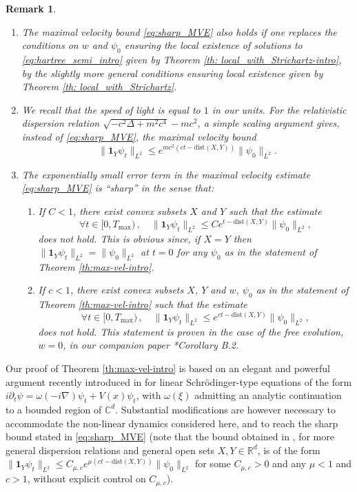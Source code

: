 \documentclass[12pt]{article}
\newcommand{\R}{\mathbb{R}}
\newcommand{\dXY}{{\mathrm{dist}(X,Y)}}
\theoremstyle{plain}
\newtheorem{rem}[theo]{Remark}
\begin{document}
\begin{rem}$ $
\begin{enumerate}
\item    The maximal velocity bound \eqref{eq:sharp_MVE} also holds if one replaces the conditions on $w$ and $\psi_0$ ensuring the local existence of solutions to \eqref{eq:hartree_semi_intro} given by Theorem \ref{th: local_with_Strichartz-intro}, by the slightly more general conditions ensuring local existence given by Theorem \ref{th: local_with_Strichartz}.
\item
We recall that the speed of light is equal to $1$ in our units. For the relativistic dispersion relation $\sqrt{-c^2\Delta+m^2c^4}-mc^2$, a simple scaling argument gives, instead of \eqref{eq:sharp_MVE}, the maximal velocity bound
    \begin{equation*}
        \|\mathbf{1}_Y\psi_t\|_{L^2}\le e^{mc^2(ct-\dXY)}\|\psi_0\|_{L^2}.
    \end{equation*}
\item
The exponentially small error term in the maximal velocity estimate \eqref{eq:sharp_MVE} is ``sharp'' in the sense that:
\begin{enumerate}
    \item If $C<1$, there exist convex subsets $X$ and $Y$ such that the estimate 
\begin{equation*}
        \forall t\in [0,T_{\mathrm{max}})\,,\quad \|\mathbf{1}_Y \psi_t\|_{L^2} \le C e^{t-\dXY}\|\psi_0\|_{L^2},
\end{equation*}
does \emph{not} hold. This is obvious since, if $X=Y$ then $\|\mathbf{1}_Y \psi_t \|_{L^2}= \|\psi_0\|_{L^2}$ at $t=0$ for any $\psi_0$ as in the statement of Theorem \ref{th:max-vel-intro}.
\item If $c<1$, there exist convex subsets $X$, $Y$ and $w$, $\psi_0$ as in the statement of Theorem \ref{th:max-vel-intro} such that the estimate 
\begin{equation*}
        \forall t\in [0,T_{\mathrm{max}})\,,\quad \|\mathbf{1}_Y \psi_t\|_{L^2} \le e^{ct-\dXY} \|\psi_0\|_{L^2},
\end{equation*}
does \emph{not} hold. This statement is proven in the case of the free evolution, $w=0$, in our companion paper \cite{BFG2a}*{Corollary B.2}.
\end{enumerate} 
\end{enumerate}

\end{rem}

Our proof of Theorem \ref{th:max-vel-intro} is based on an elegant and powerful argument recently introduced in \cite{SigalWu} for linear Schrödinger-type equations of the form $i\partial_t\psi=\omega(-i\nabla)\psi_t+V(x)\psi_t$, with $\omega(\xi)$ admitting an analytic continuation to a bounded region of $\mathbb{C}^d$. Substantial modifications are however necessary to accommodate the non-linear dynamics considered here, and to reach the sharp bound stated in \eqref{eq:sharp_MVE} (note that the bound obtained in \cite{SigalWu}, for more general dispersion relations and general open sets $X,Y\in\R^d$, is of the form $\|\mathbf{1}_Y\psi_t\|_{L^2}\le C_{\mu,c}e^{\mu(ct-\dXY)}\|\psi_0\|_{L^2}$ for some $C_{\mu,c}>0$ and any $\mu<1$ and $c>1$, without explicit control on $C_{\mu,c}$).
\end{document}
